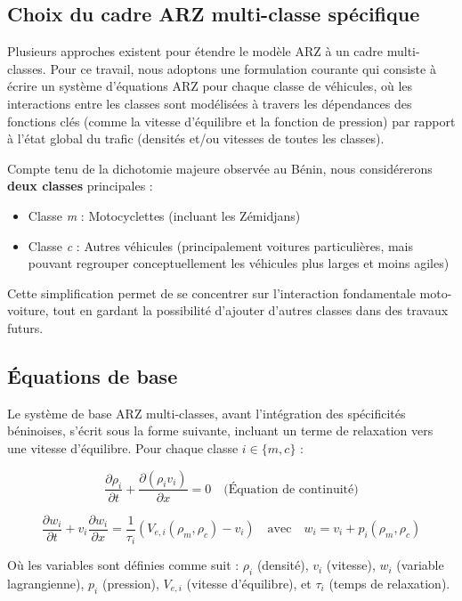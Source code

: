 \subsection{Choix du cadre ARZ multi-classe spécifique}
Plusieurs approches existent pour étendre le modèle ARZ à un cadre multi-classes. Pour ce travail, nous adoptons une formulation courante qui consiste à écrire un système d'équations ARZ pour chaque classe de véhicules, où les interactions entre les classes sont modélisées à travers les dépendances des fonctions clés (comme la vitesse d'équilibre et la fonction de pression) par rapport à l'état global du trafic (densités et/ou vitesses de toutes les classes).

Compte tenu de la dichotomie majeure observée au Bénin, nous considérerons \textbf{deux classes} principales :
\begin{itemize}
    \item Classe \textit{m} : Motocyclettes (incluant les Zémidjans)
    \item Classe \textit{c} : Autres véhicules (principalement voitures particulières, mais pouvant regrouper conceptuellement les véhicules plus larges et moins agiles)
\end{itemize}

Cette simplification permet de se concentrer sur l'interaction fondamentale moto-voiture, tout en gardant la possibilité d'ajouter d'autres classes dans des travaux futurs.

\subsection{Équations de base}
Le système de base ARZ multi-classes, avant l'intégration des spécificités béninoises, s'écrit sous la forme suivante, incluant un terme de relaxation vers une vitesse d'équilibre. Pour chaque classe $ i \in \{m, c\} $ :

\begin{equation}
\frac{\partial \rho_i}{\partial t} + \frac{\partial (\rho_i v_i)}{\partial x} = 0 \quad \text{(Équation de continuité)}
\end{equation}

\begin{equation}
\frac{\partial w_i}{\partial t} + v_i \frac{\partial w_i}{\partial x} = \frac{1}{\tau_i} (V_{e,i}(\rho_m, \rho_c) - v_i) \quad \text{avec} \quad w_i = v_i + p_i(\rho_m, \rho_c)
\end{equation}

Où les variables sont définies comme suit : $\rho_i$ (densité), $v_i$ (vitesse), $w_i$ (variable lagrangienne), $p_i$ (pression), $V_{e,i}$ (vitesse d'équilibre), et $\tau_i$ (temps de relaxation).

